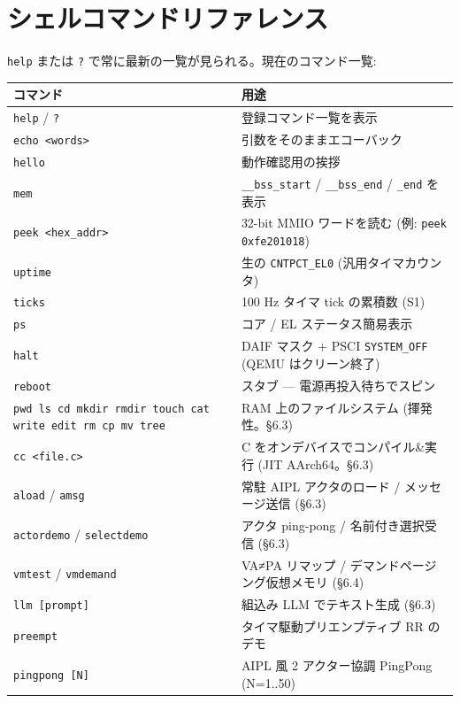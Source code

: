 \documentclass[a4paper,11pt]{ltjsarticle}
\begin{document}
\section{シェルコマンドリファレンス}
\verb|help| または \verb|?| で常に最新の一覧が見られる。現在のコマンド一覧:
\begin{center}\footnotesize
\begin{longtable}{@{}l p{8.6cm}@{}}
\toprule
\textbf{コマンド} & \textbf{用途}\\
\midrule \endhead
\verb|help| / \verb|?|    & 登録コマンド一覧を表示\\
\verb|echo <words>|       & 引数をそのままエコーバック\\
\verb|hello|             & 動作確認用の挨拶\\
\verb|mem|               & \verb|__bss_start| / \verb|__bss_end| / \verb|_end| を表示\\
\verb|peek <hex_addr>|    & 32-bit MMIO ワードを読む (例: \verb|peek 0xfe201018|)\\
\verb|uptime|           & 生の \verb|CNTPCT_EL0| (汎用タイマカウンタ)\\
\verb|ticks|            & 100 Hz タイマ tick の累積数 (S1)\\
\verb|ps|               & コア / EL ステータス簡易表示\\
\verb|halt|             & DAIF マスク + PSCI \verb|SYSTEM_OFF| (QEMU はクリーン終了)\\
\verb|reboot|           & スタブ — 電源再投入待ちでスピン\\
\verb|pwd ls cd mkdir rmdir touch cat write edit rm cp mv tree| & RAM 上のファイルシステム (揮発性。§6.3)\\
\verb|cc <file.c>|       & C をオンデバイスでコンパイル\&実行 (JIT \textrightarrow{} AArch64。§6.3)\\
\verb|aload| / \verb|amsg| & 常駐 AIPL アクタのロード / メッセージ送信 (§6.3)\\
\verb|actordemo| / \verb|selectdemo| & アクタ ping-pong / 名前付き選択受信 (§6.3)\\
\verb|vmtest| / \verb|vmdemand| & VA≠PA リマップ / デマンドページング仮想メモリ (§6.4)\\
\verb|llm [prompt]|      & 組込み LLM でテキスト生成 (§6.3)\\
\verb|preempt|          & タイマ駆動プリエンプティブ RR のデモ\\
\verb|pingpong [N]|      & AIPL 風 2 アクター協調 PingPong (N=1..50)\\

\end{longtable}
\end{center}
\end{document}
